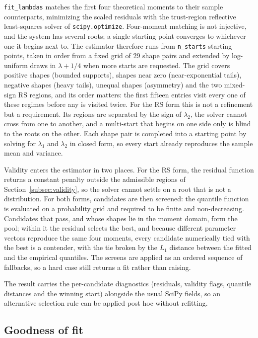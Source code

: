 \texttt{fit\_lambdas} matches the first four theoretical moments to their sample
counterparts, minimizing the scaled residuals with the trust-region reflective
least-squares solver of \texttt{scipy.optimize}. Four-moment matching is not
injective, and the system has several roots; a single starting point converges
to whichever one it begins next to. The estimator therefore runs from
\texttt{n\_starts} starting points, taken in order from a fixed grid of
$29$ shape pairs and extended by log-uniform draws in $\lambda + 1/4$ when more
starts are requested. The grid covers positive shapes (bounded supports), shapes
near zero (near-exponential tails), negative shapes (heavy tails), unequal
shapes (asymmetry) and the two mixed-sign RS regions, and its order matters: the
first fifteen entries visit every one of these regimes before any is visited
twice. For the RS form this is not a refinement but a requirement. Its regions
are separated by the sign of $\lambda_2$, the solver cannot cross from one to
another, and a multi-start that begins on one side only is blind to the roots on
the other. Each shape pair is completed into a starting point by solving for
$\lambda_1$ and $\lambda_2$ in closed form, so every start already reproduces the
sample mean and variance.

Validity enters the estimator in two places. For the RS form, the residual
function returns a constant penalty outside the admissible regions of
Section~\ref{subsec:validity}, so the solver cannot settle on a root that is not
a distribution. For both forms, candidates are then screened: the quantile
function is evaluated on a probability grid and required to be finite and
non-decreasing. Candidates that pass, and whose shapes lie in the moment domain,
form the pool; within it the residual selects the best, and because different
parameter vectors reproduce the same four moments, every candidate numerically
tied with the best is a contender, with the tie broken by the $L_1$ distance
between the fitted and the empirical quantiles. The screens are applied as an
ordered sequence of fallbacks, so a hard case still returns a fit rather than
raising.

The result carries the per-candidate diagnostics (residuals, validity flags,
quantile distances and the winning start) alongside the usual SciPy fields, so
an alternative selection rule can be applied post hoc without refitting.

\subsection{Goodness of fit}


